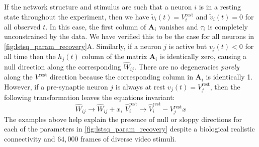 \documentclass{article}
\def\eg{{\it e.g.}}
\def\vrest{V^{\mathrm{rest}}}
\begin{document}
If the network structure and stimulus are such that a neuron $i$ is in a resting state throughout 
the experiment, then we have $\tilde{v}_i(t) = \vrest_i$ and $\dot{\tilde{v}}_i(t) = 0$ for all observed 
$t$. In this case, the first column of $\mathbf{A}_i$ vanishes and $\tau_i$ is completely unconstrained 
by the data. We have verified this to be the case for all neurons in \cref{fig:lstsq_param_recovery}A.
Similarly, if a neuron $j$ is active but $v_j(t) < 0$ for all time then the $h_j(t)$ column of the
matrix $\mathbf{A}_i$ is identically zero, causing a null direction along the corresponding $\hat{W}_{ij}$.
There are no degeneracies \emph{purely} along the $\vrest$ direction because the corresponding column in
$\mathbf{A}_i$ is identically 1. However, if a pre-synaptic neuron $j$ is always at rest $v_j(t) = \vrest_j$, then the following transformation leaves the equations invariant:
\begin{equation}
    \hat{W}_{ij} \rightarrow \hat{W}_{ij} + x, \ 
    \hat{V}^\mathrm{rest}_i \rightarrow \hat{V}^\mathrm{rest}_i - \vrest_j x
\end{equation}
The examples above help explain the presence of null or sloppy directions for each of the parameters 
in \cref{fig:lstsq_param_recovery} despite a biological realistic connectivity and $64{,}000$ frames
of diverse video stimuli.





\end{document}
